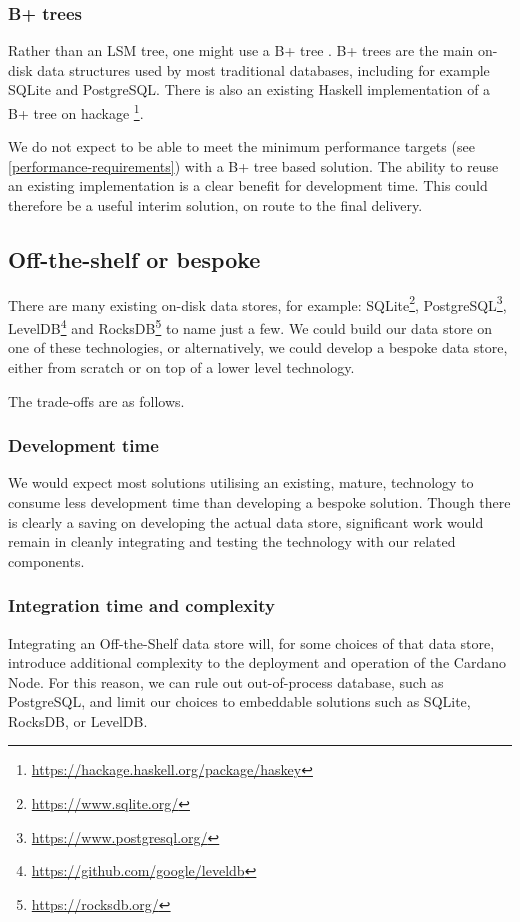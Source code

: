 \documentclass[11pt,a4paper]{article}
\begin{document}
\subsubsection{B+ trees}
Rather than an LSM tree, one might use a B+ tree \citep{journals/csur/Comer79}.
B+ trees are the main on-disk data structures used by most traditional
databases, including for example SQLite and PostgreSQL. There is also an
existing Haskell implementation of a B+ tree on hackage%
\footnote{\url{https://hackage.haskell.org/package/haskey}}.

We do not expect to be able to meet the minimum performance targets (see 
\cref{performance-requirements}) with a B+ tree based solution. The ability to
reuse an existing implementation is a clear benefit for development time. This
could therefore be a useful interim solution, on route to the final delivery.

\subsection{Off-the-shelf or bespoke}

There are many existing on-disk data stores, for example:
SQLite\footnote{\url{https://www.sqlite.org/}},
PostgreSQL\footnote{\url{https://www.postgresql.org/}},
LevelDB\footnote{\url{https://github.com/google/leveldb}}
and RocksDB\footnote{\url{https://rocksdb.org/}} to name just a few.
We could build our data store on one of these technologies, or alternatively,
we could develop a bespoke data store, either from scratch or on top of a lower
level technology.

The trade-offs are as follows.

\subsubsection{Development time}

We would expect most solutions utilising an existing, mature, technology to
consume less development time than developing a bespoke solution. Though there
is clearly a saving on developing the actual data store, significant work would
remain in cleanly integrating and testing the technology with our related
components.

\subsubsection{Integration time and complexity}

Integrating an Off-the-Shelf data store will, for some choices of that data
store, introduce additional complexity to the deployment and operation of the
Cardano Node. For this reason, we can rule out out-of-process database, such as
PostgreSQL, and limit our choices to embeddable solutions such as SQLite,
RocksDB, or LevelDB.
\end{document}
